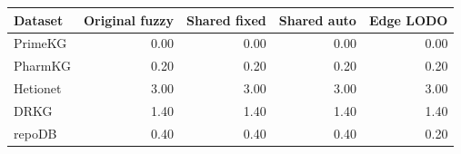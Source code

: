 \begin{tabular}{lrrrr}
\toprule
Dataset & Original fuzzy & Shared fixed & Shared auto & Edge LODO \\
\midrule
PrimeKG & 0.00 & 0.00 & 0.00 & 0.00 \\
PharmKG & 0.20 & 0.20 & 0.20 & 0.20 \\
Hetionet & 3.00 & 3.00 & 3.00 & 3.00 \\
DRKG & 1.40 & 1.40 & 1.40 & 1.40 \\
repoDB & 0.40 & 0.40 & 0.40 & 0.20 \\
\bottomrule
\end{tabular}
